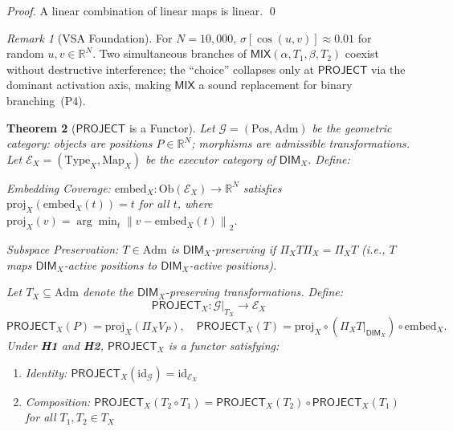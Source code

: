 \documentclass[10pt,twocolumn]{article}
\theoremstyle{plain}
\newtheorem{theorem}{Theorem}[section]
\theoremstyle{definition}
\theoremstyle{remark}
\newtheorem{remark}[theorem]{Remark}
\newcommand{\RR}{\mathbb{R}}
\newcommand{\Mix}{\mathsf{MIX}}
\newcommand{\Project}{\mathsf{PROJECT}}
\newcommand{\DimX}{\mathsf{DIM}_X}
\newcommand{\ProxX}{\Pi_X}
\newcommand{\EmbX}{\mathrm{embed}_X}
\newcommand{\ProjX}{\mathrm{proj}_X}
\newcommand{\Ob}{\mathrm{Ob}}
\newcommand{\norm}[1]{\left\|#1\right\|}
\begin{document}
\begin{proof}
A linear combination of linear maps is linear. \qed
\end{proof}

\begin{remark}[VSA Foundation]
For $N = 10{,}000$, $\sigma[\cos(u,v)] \approx 0.01$ for random $u, v \in
\RR^N$. Two simultaneous branches of $\Mix(\alpha, T_1, \beta, T_2)$ coexist
without destructive interference; the ``choice'' collapses only at $\Project$
via the dominant activation axis, making $\Mix$ a sound replacement for
binary branching~(P4).
\end{remark}

\begin{theorem}[$\Project$ is a Functor]
\label{thm:functor}
Let $\mathcal{G} = (\mathrm{Pos}, \mathrm{Adm})$ be the \emph{geometric
category}: objects are positions $P \in \RR^N$; morphisms are admissible
transformations. Let $\mathcal{E}_X = (\mathrm{Type}_X, \mathrm{Map}_X)$ be the
\emph{executor category} of $\DimX$. Define:

\begin{description}[leftmargin=1.5em]
\item[\textbf{H1}] \emph{Embedding Coverage:} $\EmbX\colon
  \Ob(\mathcal{E}_X) \to \RR^N$ satisfies $\ProjX(\EmbX(t)) = t$ for all $t$,
  where $\ProjX(v) = \arg\min_{t} \norm{v - \EmbX(t)}_2$.
\item[\textbf{H2}] \emph{Subspace Preservation:} $T \in \mathrm{Adm}$ is
  $\DimX$-preserving if $\ProxX T \ProxX = \ProxX T$ (i.e., $T$ maps
  $\DimX$-active positions to $\DimX$-active positions).
\end{description}

Let $T_X \subseteq \mathrm{Adm}$ denote the $\DimX$-preserving transformations.
Define:
\[
  \Project_X\colon \mathcal{G}\big|_{T_X} \to \mathcal{E}_X
\]
\[
  \Project_X(P) = \ProjX(\ProxX V_P), \quad
  \Project_X(T) = \ProjX \circ (\ProxX T|_{\DimX}) \circ \EmbX.
\]
Under \textbf{H1} and \textbf{H2}, $\Project_X$ is a functor satisfying:
\begin{enumerate}[label=\textup{(\alph*)}]
\item \emph{Identity:} $\Project_X(\mathrm{id}_\mathcal{G}) = \mathrm{id}_{\mathcal{E}_X}$
\item \emph{Composition:} $\Project_X(T_2 \circ T_1) = \Project_X(T_2) \circ
  \Project_X(T_1)$ for all $T_1, T_2 \in T_X$
\end{enumerate}
\end{theorem}
\end{document}

